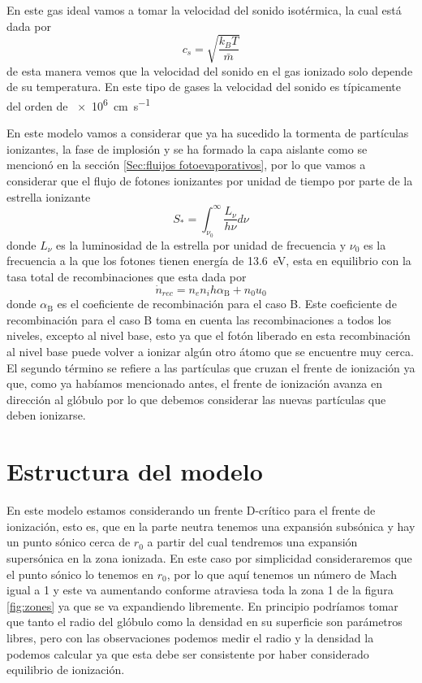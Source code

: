 \documentclass{book}
\begin{document}
En este gas ideal vamos a tomar la velocidad del sonido isotérmica, la cual está dada por
\[c_s  = \sqrt{\frac{k_B T}{\bar{m}}}\] de esta manera vemos que la velocidad del sonido en el gas ionizado solo depende de su temperatura. En este tipo de gases la velocidad del sonido es típicamente del orden de \SI{e6}{cm.s^{-1}}


En este modelo vamos a considerar que  ya ha sucedido la tormenta de partículas ionizantes, la fase de implosión y se ha formado la capa aislante como se mencionó en la sección \ref{Sec:fluijos fotoevaporativos}, por lo que vamos a considerar que el flujo de fotones ionizantes por unidad de tiempo por parte de la estrella ionizante 
\[S_* = \int_{\nu_0}^\infty \frac{L_\nu}{h\nu}d\nu\] donde $L_\nu$ es la luminosidad de la estrella por unidad de frecuencia y $\nu_0$ es la frecuencia a la que los fotones tienen energía de \SI{13.6}{eV}, esta en equilibrio con la tasa total de recombinaciones que esta dada por 
\[\dot{n}_{rec}=n_e n_i h \alpha_\mathrm{B}+n_0u_0\] donde $\alpha_\mathrm{B}$ es el coeficiente de recombinación para el caso B. Este coeficiente de recombinación para el caso B toma en cuenta las recombinaciones a todos los niveles, excepto al nivel base, esto ya que el fotón liberado en esta recombinación al nivel base puede volver a ionizar algún otro átomo que se encuentre muy cerca. El segundo término se refiere a las partículas que cruzan el frente de ionización ya que, como ya habíamos mencionado antes, el frente de ionización avanza en dirección al glóbulo por lo que debemos considerar las nuevas partículas que deben ionizarse. 

\section{Estructura del modelo}\label{Estructura}

En este modelo  estamos considerando un frente D-crítico para el frente de ionización, esto es, que en la parte neutra tenemos una expansión subsónica y hay un punto sónico cerca de $r_0$ a partir del cual tendremos una expansión supersónica en la zona ionizada. En este caso por simplicidad consideraremos que el punto sónico lo tenemos en $r_0$, por lo que aquí tenemos un número de Mach igual a 1 y este va aumentando conforme atraviesa toda la zona 1 de la figura \ref{fig:zones} ya que se va expandiendo libremente. En principio podríamos tomar que tanto el radio del glóbulo como la densidad en su superficie son parámetros libres, pero con las observaciones podemos medir el radio y la densidad la podemos calcular ya que esta debe ser consistente por haber considerado equilibrio de ionización.
\end{document}
